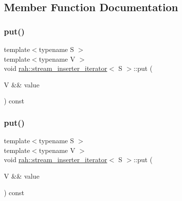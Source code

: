 \subsection{Member Function Documentation}
\mbox{\label{structrah_1_1stream__inserter__iterator_a449c0bfdb9f253260430c0184ef370fe}} 
\subsubsection{\texorpdfstring{put()}{put()}\hspace{0.1cm}{\footnotesize\ttfamily [1/2]}}
{\footnotesize\ttfamily template$<$typename S $>$ \\
template$<$typename V $>$ \\
void \mbox{\hyperlink{structrah_1_1stream__inserter__iterator}{rah\+::stream\+\_\+inserter\+\_\+iterator}}$<$ S $>$\+::put (\begin{DoxyParamCaption}\item[{V \&\&}]{value }\end{DoxyParamCaption}) const\hspace{0.3cm}{\ttfamily [inline]}}

\mbox{\label{structrah_1_1stream__inserter__iterator_a449c0bfdb9f253260430c0184ef370fe}} 
\subsubsection{\texorpdfstring{put()}{put()}\hspace{0.1cm}{\footnotesize\ttfamily [2/2]}}
{\footnotesize\ttfamily template$<$typename S $>$ \\
template$<$typename V $>$ \\
void \mbox{\hyperlink{structrah_1_1stream__inserter__iterator}{rah\+::stream\+\_\+inserter\+\_\+iterator}}$<$ S $>$\+::put (\begin{DoxyParamCaption}\item[{V \&\&}]{value }\end{DoxyParamCaption}) const\hspace{0.3cm}{\ttfamily [inline]}}



